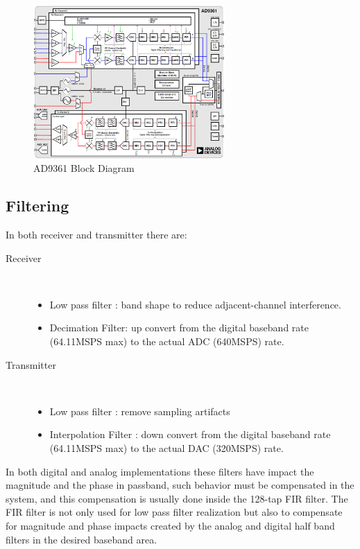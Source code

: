 \begin{figure}[htbp]
    \centering
    \includegraphics[width=0.65\textwidth]{./figures/ad9361_block_diagram}
    \caption{ AD9361 Block Diagram
    \label{fig:ad9361blk}}
\end{figure}

\subsection{Filtering}

In both receiver and transmitter there are:
\begin{description}
	\item[Receiver] \hfill \\
	\begin{itemize}
		\item Low pass filter : band shape to reduce adjacent-channel interference.
		\item Decimation Filter: up convert from the digital baseband rate (64.11MSPS max) to the actual ADC (640MSPS) rate.
	\end{itemize}
	\item[Transmitter] \hfill \\
\begin{itemize}
		\item Low pass filter : remove sampling artifacts
		\item Interpolation Filter : down convert from the digital baseband rate (64.11MSPS max) to the actual DAC (320MSPS) rate.
	\end{itemize}
\end{description}

In both digital and analog implementations these filters have impact the magnitude and the phase in passband, such behavior must be compensated in the system, and this compensation is usually done inside the 128-tap FIR filter. The FIR filter is not only used for low pass filter realization but also to compensate for magnitude and phase impacts created by the analog and digital half band filters in the desired baseband area. 

